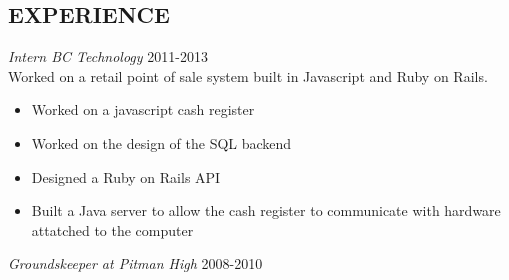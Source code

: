 \documentclass[line, margin]{res}
\begin{document}
\begin{resume}
    \section{EXPERIENCE}
    \textit{Intern BC Technology} \hfill 2011-2013 \\
    Worked on a retail point of sale system built in Javascript and Ruby on Rails.
    \begin{itemize}
      \item Worked on a javascript cash register
      \item Worked on the design of the SQL backend
      \item Designed a Ruby on Rails API
      \item Built a Java server to allow the cash register to communicate with hardware attatched to the computer
    \end{itemize}
    \textit{Groundskeeper at Pitman High} \hfill 2008-2010 \\
  \end{resume}
\end{document}

